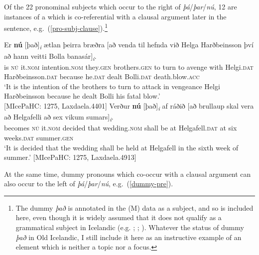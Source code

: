 \documentclass[output=paper,colorlinks,citecolor=brown]{langscibook}
\begin{document}
Of the 22 pronominal subjects which occur to the right of \textit{þá}/\textit{þar}/\textit{nú}, 12 are instances of a  which is co-referential with a clausal argument later in the sentence, e.g.~(\ref{pro-subj-clause}).\footnote{The dummy \textit{það} is annotated in the (M) data as a subject, and so is included here, even though it is widely assumed that it does not qualify as a grammatical subject in Icelandic (e.g. \citealp[480--481]{Thrainsson1979}; \citealp{Platzack1983existential}; \citealp{Maling1988}). Whatever the status of dummy \textit{það} in Old Icelandic, I still include it here as an instructive example of an element which is neither a topic nor a focus.}

\ea \label{pro-subj-clause}
\ea %
    \gll Er \textbf{nú} [það]\textsubscript{\textit{i}} ætlan þeirra bræðra [að venda til hefnda við Helga Harðbeinsson {því að} hann veitti Bolla banasár]\textsubscript{\textit{i}}.\\
    is \textsc{nú} it.\textsc{nom} intention.\textsc{nom} they.\textsc{gen} brothers.\textsc{gen} to turn to avenge with Helgi.\textsc{dat}  Harðbeinsson.\textsc{dat} because he.\textsc{dat} dealt Bolli.\textsc{dat} death.blow.\textsc{acc}\\
    \glt `It is the intention of the brothers to turn to attack in vengeance Helgi Harðbeinsson because he dealt Bolli his fatal blow.'\\ \hfill [MIcePaHC: 1275, Laxdaela.4401]
    \ex \label{aux-3} %
    \gll Verður \textbf{nú} [það]\textsubscript{\textit{i}} {af ráðið} [að brullaup skal vera að Helgafelli að sex vikum sumars]\textsubscript{\textit{i}}.\\
    becomes \textsc{nú} it.\textsc{nom} decided that wedding.\textsc{nom} shall be at Helgafell.\textsc{dat} at six weeks.\textsc{dat} summer.\textsc{gen}\\
    \glt `It is decided that the wedding shall be held at Helgafell in the sixth week of summer.' \hfill [MIcePaHC: 1275, Laxdaela.4913]
\z
\z

\noindent At the same time, dummy pronouns which co-occur with a clausal argument can also occur to the left of \textit{þá}/\textit{þar}/\textit{nú}, e.g.~(\ref{dummy-pre}).
\end{document}
